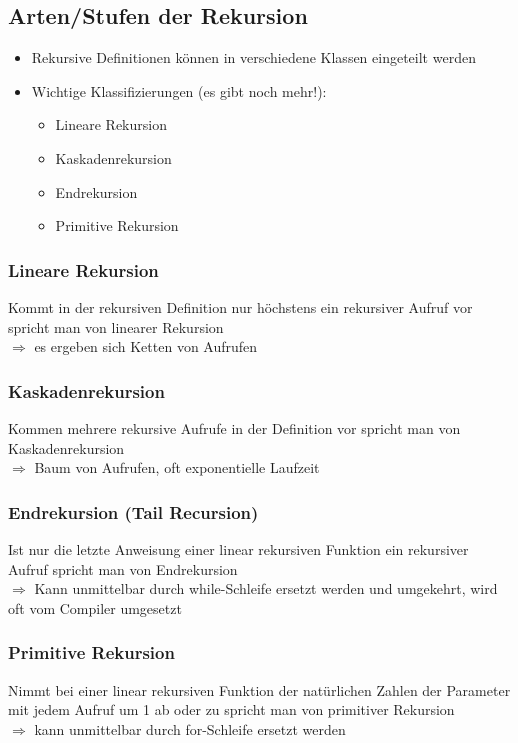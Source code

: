 \subsection{Arten/Stufen der Rekursion}
\begin{itemize}
\item Rekursive Definitionen können in verschiedene Klassen eingeteilt werden
\item Wichtige Klassifizierungen (es gibt noch mehr!):
	\begin{itemize}
	\item Lineare Rekursion
	\item Kaskadenrekursion
	\item Endrekursion
	\item Primitive Rekursion
	\end{itemize}
\end{itemize}
\subsubsection{Lineare Rekursion}
Kommt in der rekursiven Definition nur höchstens ein rekursiver Aufruf vor spricht man von linearer Rekursion \\
$\Rightarrow$ es ergeben sich Ketten von Aufrufen
\subsubsection{Kaskadenrekursion}
Kommen mehrere rekursive Aufrufe in der Definition vor spricht man von Kaskadenrekursion\\
$\Rightarrow$ Baum von Aufrufen, oft exponentielle Laufzeit
\subsubsection{Endrekursion (Tail Recursion)}
Ist nur die letzte Anweisung einer linear rekursiven Funktion ein rekursiver Aufruf spricht man von Endrekursion\\
$\Rightarrow$ Kann unmittelbar durch while-Schleife ersetzt werden und umgekehrt, wird oft vom Compiler umgesetzt
\subsubsection{Primitive Rekursion}
Nimmt bei einer linear rekursiven Funktion der natürlichen Zahlen der Parameter mit jedem Aufruf um 1 ab oder zu spricht man von primitiver Rekursion \\
$\Rightarrow$ kann unmittelbar durch for-Schleife ersetzt werden
%
%
%
